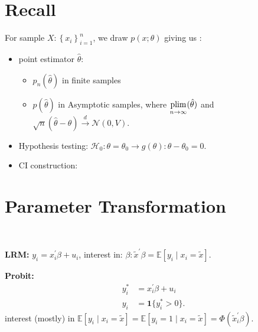 \section{Recall}

For sample $X: \left\{ x_i \right\}_{i=1}^{n}$, we draw $p(x; \theta)$
giving us :
\begin{itemize}
    \item point estimator $\hat{\theta}$:
    \begin{itemize}
        \item $p_n(\hat{\theta})$ in finite samples
        \item $p(\hat{\theta})$ in Asymptotic samples,
        where $\underset{n \to \infty}{\operatorname*{plim}}(\hat{\theta})$ and $\sqrt{n} (\hat{\theta} - \theta) \xrightarrow{d} \mathcal{N} (0, V)$.
    \end{itemize}
    \item Hypothesis testing: $\mathcal{H}_0: \theta = \theta_0 \rightarrow g(\theta): \theta -\theta_0 = 0$.
    \item CI construction: 
\end{itemize}

\section{Parameter Transformation}

\begin{eg}
    \

    \textbf{LRM:} $y_i = x_i^{\prime} \beta  + u_i$, interest in: $\beta: \tilde{x}^{\prime} \beta = \mathbb{E}[y_i \mid x_i = \tilde{x}]$.

    \textbf{Probit:} \begin{align*}
        y_i^* &= x_i^{\prime} \beta + u_i \\
        y_i &= \mathbf{1}\{y_i^* > 0\}.
    \end{align*}
    interest (mostly) in $\mathbb{E}[y_i \mid x_i = \tilde{x}] = \mathbb{E}[y_i=1 \mid x_i = \tilde{x}] = \Phi (\tilde{x}_i^{\prime} \beta)$.
\end{eg}

